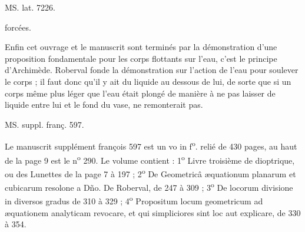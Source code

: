 \documentclass[11pt,a4paper]{article}
\begin{document}
MS. lat. 7226.

forcées.

Enfin cet ouvrage et le manuscrit sont terminés par la démonstration d'une proposition fondamentale pour les corps flottants sur l'eau, c'est le principe d'Archimède. Roberval fonde la démonstration sur l'action de l'eau pour soulever le corps ; il faut donc qu'il y ait du liquide au dessous de lui, de sorte que si un corps même plus léger que l'eau était plongé de manière à ne pas laisser de liquide entre lui et le fond du vase,  ne remonterait pas.


MS. suppl. franç. 597.

Le manuscrit supplément françois 597 est un vo in f\textsuperscript{o}. relié de 430 pages, au haut de la page 9 est \ill{} le n\textsuperscript{o} 290. Le volume contient : 1\textsuperscript{o} Livre troisième de dioptrique, ou des Lunettes de la page 7 à 197 ; 2\textsuperscript{o} De Geometricâ æquationum planarum et cubicarum resol\ill{}one a Dño. De Roberval, de 247 à 309 ; 3\textsuperscript{o} De locorum divisione in diversos gradus de 310 à 329 ; 4\textsuperscript{o} Propositum locum geometricum ad æquationem analyticam revocare, et qui simpliciores sint loc\ill{} aut  explicare, de 330 à 354.
\end{document}

